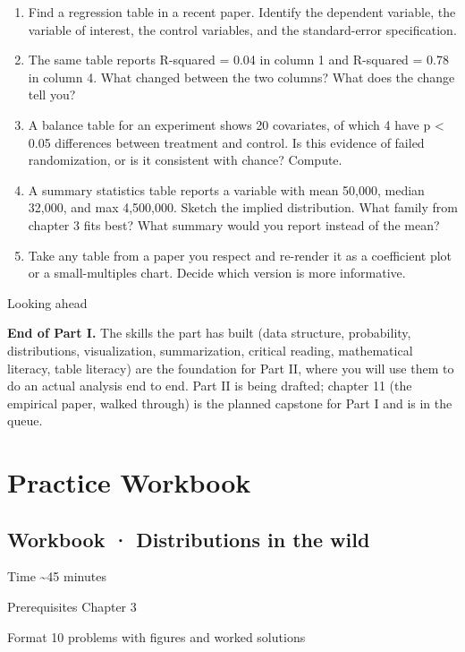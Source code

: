 \documentclass[
  letterpaper,
  11pt,
  twoside,
  openany]{scrbook}
\begin{document}
\begin{enumerate}
\def\labelenumi{\arabic{enumi}.}
\item
  Find a regression table in a recent paper. Identify the dependent
  variable, the variable of interest, the control variables, and the
  standard-error specification.
\item
  The same table reports R-squared = 0.04 in column 1 and R-squared =
  0.78 in column 4. What changed between the two columns? What does the
  change tell you?
\item
  A balance table for an experiment shows 20 covariates, of which 4 have
  p \textless{} 0.05 differences between treatment and control. Is this
  evidence of failed randomization, or is it consistent with chance?
  Compute.
\item
  A summary statistics table reports a variable with mean 50,000, median
  32,000, and max 4,500,000. Sketch the implied distribution. What
  family from chapter 3 fits best? What summary would you report instead
  of the mean?
\item
  Take any table from a paper you respect and re-render it as a
  coefficient plot or a small-multiples chart. Decide which version is
  more informative.
\end{enumerate}

{Looking ahead}

\textbf{End of Part I.} The skills the part has built (data structure,
probability, distributions, visualization, summarization, critical
reading, mathematical literacy, table literacy) are the foundation for
Part II, where you will use them to do an actual analysis end to end.
Part II is being drafted; chapter 11 (the empirical paper, walked
through) is the planned capstone for Part I and is in the queue.

\part{Practice Workbook}

\chapter{Workbook · Distributions in the
wild}\label{workbook-distributions-in-the-wild}

{Time} {\textasciitilde45 minutes}

{Prerequisites} {Chapter 3}

{Format} {10 problems with figures and worked solutions}
\end{document}
